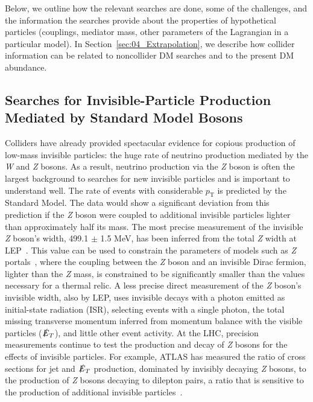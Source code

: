 \documentclass{ar-1col}
\newcommand{\IP}{invisible particle}
\newcommand{\pt}{\ensuremath{p_\mathrm{T}}\xspace}
\newcommand{\MET}{\ensuremath{\slashed{E}_T}\xspace}
\begin{document}
{Below, we outline how the relevant searches are done, some
of the challenges, and the information the searches provide about the properties
of hypothetical particles (couplings, mediator mass, other
parameters of the Lagrangian in a particular model). In Section~\ref{sec:04_Extrapolation}, 
we describe how collider information can be related to
noncollider DM searches and to the present DM abundance.

\subsection{Searches for Invisible-Particle Production Mediated by Standard Model Bosons}\label{sec:results_ZHSearches}

Colliders have already provided spectacular evidence for copious production of low-mass invisible particles: the huge rate of neutrino production
mediated by the \textit{W} and \textit{Z} bosons. As a result, neutrino production via the \textit{Z}
boson is often the largest background to searches for new {\IP}s
and is important to understand well. 
The rate of events with considerable \pt is predicted by the Standard Model.
The data would show a significant deviation from this prediction if 
the \textit{Z} boson were coupled to additional {\IP}s
lighter than approximately half its mass. 
The most precise measurement of
the invisible \textit{Z} boson's width, 499.1 $\pm$ 1.5 MeV, has been inferred from
the total \textit{Z}
width at LEP~\cite{ALEPH:2005ab}. This value can be used to
constrain the parameters of models such as \textit{Z}
portals~\cite{Carena:2003aj,Escudero:2016gzx}, where the coupling
between the \textit{Z} boson and an invisible Dirac fermion, 
lighter than the \textit{Z} mass, is constrained to be
significantly smaller than the values necessary for a thermal relic.
A less precise direct measurement of the \textit{Z} boson's
invisible width, also by LEP, uses invisible decays with a photon
emitted as initial-state radiation (ISR), selecting events with a
single photon, the total missing transverse momentum inferred
from momentum balance with the visible particles (\MET), and
little other event activity.  At the
LHC, precision measurements continue to test the production and
decay of \textit{Z} bosons for the effects of {\IP}s. 
For example, ATLAS
has measured the ratio of cross sections for jet and \MET
production, dominated by invisibly decaying \textit{Z} bosons, to
the production of \textit{Z} bosons decaying to dilepton pairs, a ratio that
is sensitive to the production of additional
{\IP}s~\cite{Aaboud:2017buf}.

}
\end{document}
